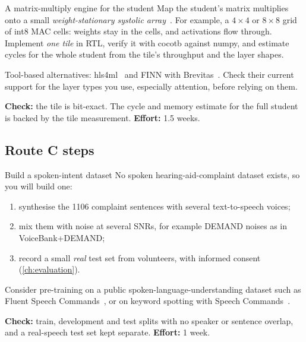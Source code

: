 \begin{stepbox}[label=st:ml:matmul]{A matrix-multiply engine for the student}
Map the student's matrix multiplies onto a small \emph{weight-stationary
systolic array}~\cite{kung1982systolic,chen2017eyeriss}. For example, a
$4\times4$ or $8\times8$ grid of int8 MAC cells: weights stay in the cells, and
activations flow through. Implement \emph{one tile} in RTL, verify it with cocotb
against numpy, and estimate cycles for the whole student from the tile's
throughput and the layer shapes.

Tool-based alternatives: hls4ml~\cite{duarte2018hls4ml,ch12-13:hls4mldocs} and
FINN with Brevitas~\cite{umuroglu2017finn,brevitas}. Check their current support
for the layer types you use, especially attention, before relying on them.

\textbf{Check:} the tile is bit-exact. The cycle and memory estimate for the
full student is backed by the tile measurement. \textbf{Effort:} 1.5 weeks.
\end{stepbox}

\subsection{Route C steps}

\begin{stepbox}[label=st:ml:audiodata]{Build a spoken-intent dataset}
No spoken hearing-aid-complaint dataset exists, so you will build one:
\begin{enumerate}
  \item synthesise the 1106 complaint sentences with several text-to-speech
        voices;
  \item mix them with noise at several SNRs, for example DEMAND noises as in
        VoiceBank+DEMAND;
  \item record a small \emph{real} test set from volunteers, with informed
        consent (\cref{ch:evaluation}).
\end{enumerate}
Consider pre-training on a public spoken-language-understanding dataset such as
Fluent Speech Commands~\cite{lugosch2019fsc}, or on keyword spotting with
Speech Commands~\cite{warden2018speechcommands}.

\textbf{Check:} train, development and test splits with no speaker or sentence
overlap, and a real-speech test set kept separate. \textbf{Effort:} 1 week.
\end{stepbox}

